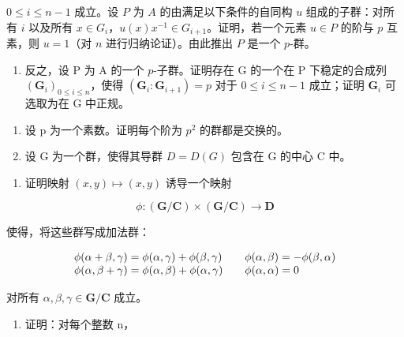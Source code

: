 \(0 \leqslant i \leqslant n - 1\) 成立。设 \(P\) 为 \(A\) 的由满足以下条件的自同构 \(u\) 组成的子群：对所有 \(i\) 以及所有 \(x \in G_i\)，\(u(x)x^{-1} \in G_{i+1}\)。证明，若一个元素 \(u \in P\) 的阶与 \(p\) 互素，则 \(u = 1\)（对 \(n\) 进行归纳论证）。由此推出 \(P\) 是一个 \(p\)-群。

\begin{enumerate}
\def\labelenumi{(\alph{enumi})}
\setcounter{enumi}{1}
\tightlist
\item
  反之，设 P 为 A 的一个 \(p\)-子群。证明存在 G 的一个在 P 下稳定的合成列 \((\mathbf{G}_i)_{0 \leqslant i \leqslant n}\)，使得 \((\mathbf{G}_i: \mathbf{G}_{i+1}) = p\) 对于 \(0 \leqslant i \leqslant n-1\) 成立；证明 \(\mathbf{G}_i\) 可选取为在 G 中正规。
\end{enumerate}

\begin{enumerate}
\def\labelenumi{\arabic{enumi}。}
\setcounter{enumi}{33}
\item
  设 p 为一个素数。证明每个阶为 \(p^{2}\) 的群都是交换的。
\item
  设 G 为一个群，使得其导群 \(D = D(G)\) 包含在 G 的中心 C 中。
\end{enumerate}

\begin{enumerate}
\def\labelenumi{(\alph{enumi})}
\tightlist
\item
  证明映射 \((x,y)\mapsto (x,y)\) 诱导一个映射
\end{enumerate}

\[
\phi \colon (\mathbf {G} / \mathbf {C}) \times (\mathbf {G} / \mathbf {C}) \rightarrow \mathbf {D}
\]

使得，将这些群写成加法群：

\[
\begin{array}{l l} \phi (\alpha + \beta , \gamma) = \phi (\alpha , \gamma) + \phi (\beta , \gamma) & \quad \phi (\alpha , \beta) = - \phi (\beta , \alpha) \\ \phi (\alpha , \beta + \gamma) = \phi (\alpha , \beta) + \phi (\alpha , \gamma) & \quad \phi (\alpha , \alpha) = 0 \end{array}
\]

对所有 \(\alpha, \beta, \gamma \in \mathbf{G} / \mathbf{C}\) 成立。

\begin{enumerate}
\def\labelenumi{(\alph{enumi})}
\setcounter{enumi}{1}
\tightlist
\item
  证明：对每个整数 n，
\end{enumerate}

